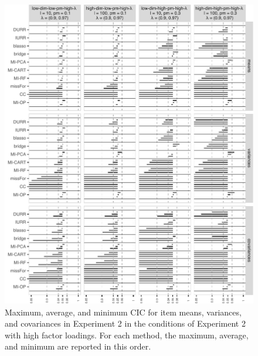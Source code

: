 \begin{figure}
	\includegraphics{../../output/graphs/exp2_semR_ci_14_summy.pdf}
\caption{
	Maximum, average, and minimum CIC for item means, variances, and covariances in Experiment 2
	in the conditions of Experiment 2 with high factor loadings.
	For each method, the maximum, average, and minimum are reported in this order.
}
\label{fig:exp2cir14}
\end{figure}

